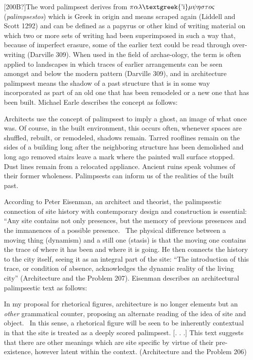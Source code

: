 {\color{black}
[200B?]The word {\textquotedbl}palimpsest{\textquotedbl} derives from
$\pi \alpha \lambda \text{\textgreek{'i}}\mu \psi \eta \sigma \tau
o\varsigma $ (\textit{palimpsestos}) which is Greek in origin and means
{\textquotedbl}scraped again{\textquotedbl} (Liddell and Scott 1292)
and can be defined as {\textquotedbl}a papyrus or other kind of writing
material on which two or more sets of writing had been superimposed in
such a way that, because of imperfect erasure, some of the earlier text
could be read through over-writing{\textquotedbl} (Darville 309).  When
used in the field of archae-ology, {\textquotedbl}the term is often
applied to landscapes in which traces of earlier arrangements can be
seen amongst and below the modern pattern{\textquotedbl} (Darville
309), and in architecture palimpsest means the shadow of a past
structure that is in some way incorporated as part of an old one that
has been remodeled or a new one that has been built.  Michael Earle
describes the concept as follows: }

{\color{black}
Architects use the concept of palimpsest to imply a ghost, an image of
what once was.  Of course, in the built environment, this occurs often,
whenever spaces are shuffled, rebuilt, or remodeled, shadows remain. 
Tarred rooflines remain on the sides of a building long after the
neighboring structure has been demolished and long ago removed stairs
leave a mark where the painted wall surface stopped.  Dust lines remain
from a relocated appliance.  Ancient ruins speak volumes of their
former wholeness.  Palimpsests can inform us of the realities of the
built past.  }

{\color{black}
According to Peter Eisenman, an architect and theorist, the palimpsestic
connection of site history with contemporary design and construction is
essential: “Any site contains not only presences, but the memory of
previous presences and the immanences of a possible presence.  ~The
physical difference between a moving thing (dynamism) and a still one
(stasis) is that the moving one contains the trace of where it has been
and where it is going.{\textquotedbl}  He then connects the history to
the city itself, seeing it as an integral part of the site: “The
introduction of this trace, or condition of absence, acknowledges the
dynamic reality of the living city” ({\textquotedbl}Architecture and
the Problem{\textquotedbl} 207).  Eisenman describes an architectural
palimpsestic text as follows: }

{\color{black}
In my proposal for rhetorical figures, architecture is no longer
elements but an \textit{other} grammatical counter, proposing an
alternate reading of the idea of site and object.  ~In this sense, a
rhetorical figure will be seen to be inherently contextual in that the
site is treated as a deeply scored palimpsest. [. . .] This text
suggests that there are other meanings which are site specific by
virtue of their pre-existence, however latent within the context. 
({\textquotedbl}Architecture and the Problem{\textquotedbl} 206)}

